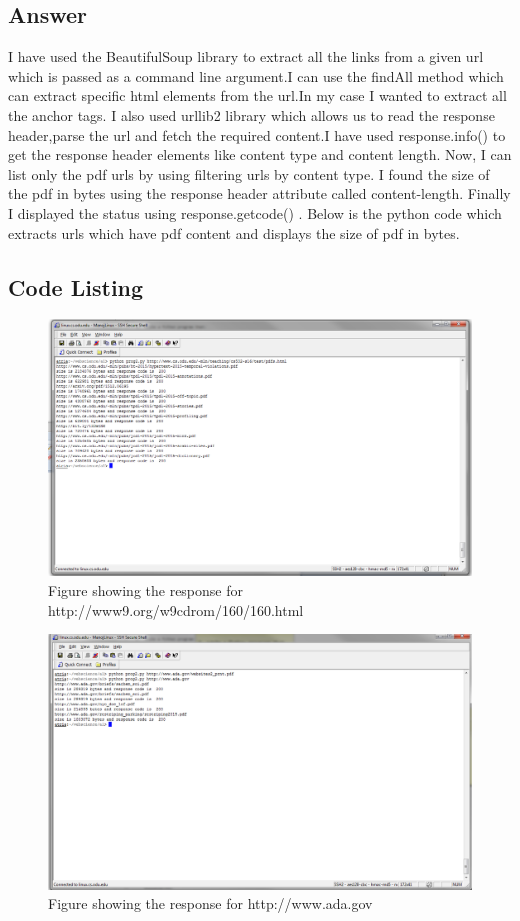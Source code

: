 \documentclass[letterpaper,11pt]{article}
\begin{document}
\newpage
\subsection*{Answer}
I have used the  BeautifulSoup library to extract all the links from a given url which is passed as a command line argument.I can use the findAll method which can extract specific html elements from the url.In my case I wanted to extract all the anchor tags. I also used urllib2 library which allows us to read the response header,parse the url and fetch the required content.I have used response.info() to get the response header elements like content type and content length. Now, I can list only the pdf urls by using filtering urls by content type. I found the size of the pdf in bytes using the response header attribute called content-length. Finally I displayed the status using response.getcode() .
Below is the python code which extracts urls which have pdf content and displays the size of pdf in bytes.
\subsection{Code Listing} 

\begin{figure}
\includegraphics[scale=0.7]{nelsonurl.png}
\caption{ Figure showing the response for http://www9.org/w9cdrom/160/160.html}
\label{fig:screen4}
\end{figure}




\begin{figure}
\includegraphics[scale=0.7]{adaurl.png}
\caption{ Figure showing the response for http://www.ada.gov}
\label{fig:screen6}
\end{figure}
\end{document}
